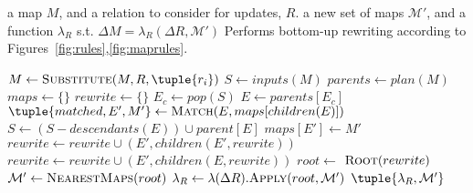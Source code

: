 \begin{algorithm}
\caption{$\rewrite(M,R)$}
\label{alg:rewrite}
\begin{codebox}
\zi {}
\zi \> a map $M$, and a relation to consider for updates, $R$.
\zi {}
\zi \> a new set of maps $\mathcal{M'}$, and a function $\lambda_R$ s.t.
\zi \>\> $\Delta M = \lambda_R(\Delta R,\mathcal{M'})$
\zi {}
\zi	\> Performs bottom-up rewriting according to
Figures~\ref{fig:rules},\ref{fig:maprules}.
\end{codebox}
\begin{algorithmic}[1]
\smallskip
\STATE $M \leftarrow \substitute(M,R,\tuple{r_i})$
\STATE $S \leftarrow inputs(M)$
\STATE $parents \leftarrow plan(M)$
\STATE $maps \leftarrow \{\}$
\STATE $rewrite \leftarrow \{\}$
	\STATE $E_{c} \leftarrow pop(S)$
	\STATE $E \leftarrow parents[E_{c}]$
	\STATE $\tuple{matched,E',M'} \leftarrow \match(E,maps[children(E)])$
		\STATE $S \leftarrow (S - descendants(E)) \cup parent[E]$
		\STATE $maps[E'] \leftarrow M'$
		\STATE $rewrite \leftarrow rewrite \cup (E',children(E',rewrite))$
	\ELSE
		\STATE $rewrite \leftarrow rewrite \cup (E',children(E,rewrite))$
	\ENDIF
\ENDWHILE
\STATE $root \leftarrow$ $\mbox{\sc Root}(rewrite)$
\STATE $\mathcal{M'} \leftarrow \mbox{\sc NearestMaps}(root)$
\STATE $\lambda_R \leftarrow \lambda(\Delta R).\mbox{\sc Apply}(root,\mathcal{M'})$
\RETURN $\tuple{\lambda_R,\mathcal{M'}}$
\end{algorithmic}
\end{algorithm}

